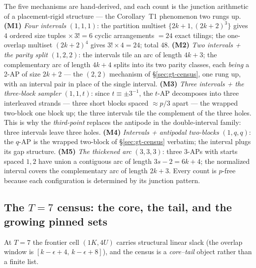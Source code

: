 The five mechanisms are hand-derived, and each count is the junction
arithmetic of a placement-rigid structure --- the Corollary~T1
phenomenon two rungs up. \textbf{(M1)} \emph{Four intervals} $(1,1,1)$:
the partition multiset $\{2k+1,(2k+2)^3\}$ gives $4$ ordered size
tuples $\times\,3!=6$ cyclic arrangements $=24$ exact tilings; the
one-overlap multiset $(2k+2)^4$ gives $3!\times4=24$; total $48$.
\textbf{(M2)} \emph{Two intervals + the parity split} $(1,2,2)$: the
intervals tile an arc of length $4k+3$; the complementary arc of length
$4k+4$ splits into its two parity classes, each \emph{being} a 2-AP of
size $2k+2$ --- the $(2,2)$ mechanism of \S\ref{sec:gt-census}, one rung
up, with an interval pair in place of the single interval.
\textbf{(M3)} \emph{Three intervals + the three-block sampler}
$(1,1,t)$: since $t\equiv\pm3^{-1}$, the $t$-AP decomposes into three
interleaved strands --- three short blocks spaced $\approx p/3$ apart
--- the wrapped two-block one block up; the three intervals tile the
complement of the three holes. This is why the \emph{third-point}
replaces the antipode in the double-interval family: three intervals
leave three holes. \textbf{(M4)} \emph{Intervals + antipodal
two-blocks} $(1,q,q)$: the $q$-AP is the wrapped two-block of
\S\ref{sec:gt-census} verbatim; the interval plugs its gap structure.
\textbf{(M5)} \emph{The thickened arc} $(3,3,3)$: three 3-APs with
starts spaced $1,2$ have union a contiguous arc of length $3s-2=6k+4$;
the normalized interval covers the complementary arc of length $2k+3$.
Every count is $p$-free because each configuration is determined by its
junction pattern.

\subsection{The \texorpdfstring{$T=7$}{T=7} census: the core, the tail, and the growing pinned sets}

At $T=7$ the frontier cell $(1K,4U)$ carries structural linear slack
(the overlap window is $[k-\epsilon+4,\,k-\epsilon+8]$), and the census
is a \emph{core--tail} object rather than a finite list.

